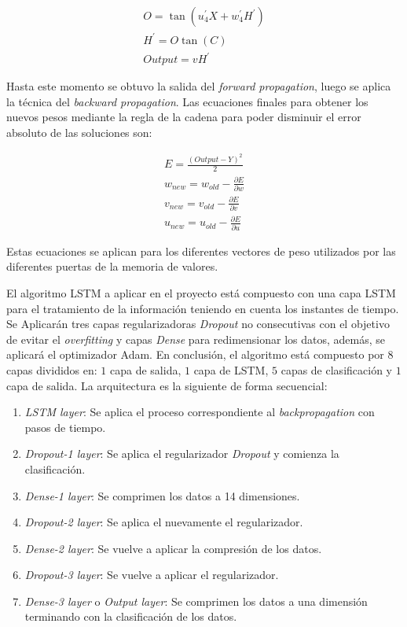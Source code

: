   \begin{align}
  	O=\tan(u_{4}^{'}X+w_{4}^{'}H^{'})\\
  	H^{'}=O\tan(C)\\
  	Output=vH^{'}
  \end{align}

  Hasta este momento se obtuvo la salida del \textit{forward propagation}, luego se aplica la t\'{e}cnica del \textit{backward propagation}. Las ecuaciones finales para obtener los nuevos pesos mediante la regla de la cadena para poder disminuir el error absoluto de las soluciones son:
  
  \begin{align}
  	E=\frac{(Output-Y)^2}{2}\\
  	w_{new}=w_{old}-\frac{\partial E}{\partial w}\\
  	v_{new}=v_{old}-\frac{\partial E}{\partial v}\\
  	u_{new}=u_{old}-\frac{\partial E}{\partial u}
  \end{align}

  Estas ecuaciones se aplican para los diferentes vectores de peso utilizados por las diferentes puertas de la memoria de valores.
  
  El algoritmo LSTM a aplicar en el proyecto est\'{a} compuesto con una capa LSTM para el tratamiento de la informaci\'{o}n teniendo en cuenta los instantes de tiempo. Se Aplicar\'{a}n tres capas regularizadoras \textit{Dropout} no consecutivas con el objetivo de evitar el \textit{overfitting} y capas \textit{Dense} para redimensionar los datos, adem\'{a}s, se aplicar\'{a} el optimizador Adam. En conclusi\'{o}n, el algoritmo est\'{a} compuesto por $8$ capas divididos en: $1$ capa de salida, $1$ capa de LSTM, $5$ capas de clasificaci\'{o}n y $1$ capa de salida. La arquitectura es la siguiente de forma secuencial:

\begin{enumerate}
	\item \textit{LSTM layer}: Se aplica el proceso correspondiente al \textit{backpropagation} con pasos de tiempo.
	\item \textit{Dropout-1 layer}: Se aplica el regularizador \textit{Dropout} y comienza la clasificaci\'{o}n.
	\item \textit{Dense-1 layer}: Se comprimen los datos a 14 dimensiones.
	\item \textit{Dropout-2 layer}: Se aplica el nuevamente el regularizador.
	\item \textit{Dense-2 layer}: Se vuelve a aplicar la compresi\'{o}n de los datos.
	\item \textit{Dropout-3 layer}: Se vuelve a aplicar el regularizador.
	\item \textit{Dense-3 layer} o \textit{Output layer}: Se comprimen los datos a una dimensi\'{o}n terminando con la clasificaci\'{o}n de los datos.
\end{enumerate}

